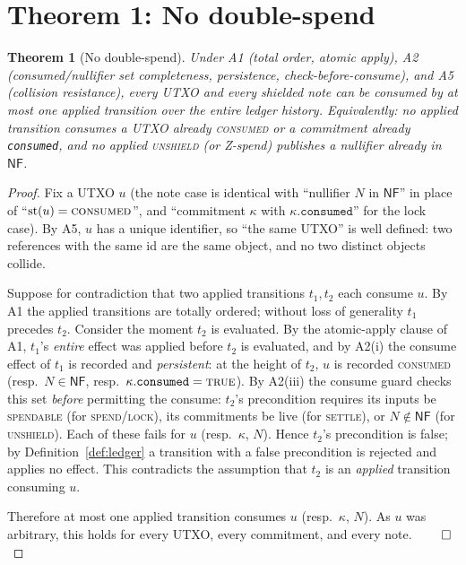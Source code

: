 \documentclass[11pt]{article}
\newtheorem{theorem}{Theorem}
\theoremstyle{definition}
\theoremstyle{remark}
\newcommand{\NF}{\mathsf{NF}}
\begin{document}
\section{Theorem 1: No double-spend}
\label{sec:t1}

\begin{theorem}[No double-spend]
\label{thm:double}
Under A1 (total order, atomic apply), A2 (consumed/nullifier set
completeness, persistence, check-before-consume), and A5 (collision
resistance), every UTXO and every shielded note can be consumed by at most
one applied transition over the entire ledger history. Equivalently: no
applied transition consumes a UTXO already \textsc{consumed} or a
commitment already \texttt{consumed}, and no applied \textsc{unshield} (or
Z-spend) publishes a nullifier already in $\NF$.
\end{theorem}

\begin{proof}
Fix a UTXO $u$ (the note case is identical with ``nullifier $N$ in $\NF$''
in place of ``$\mathrm{st}(u)=\textsc{consumed}$'', and ``commitment
$\kappa$ with $\kappa.\texttt{consumed}$'' for the lock case). By A5,
$u$ has a unique identifier, so ``the same UTXO'' is well defined: two
references with the same id are the same object, and no two distinct
objects collide.

Suppose for contradiction that two applied transitions $t_1,t_2$ each
consume $u$. By A1 the applied transitions are totally ordered; without
loss of generality $t_1$ precedes $t_2$. Consider the moment $t_2$ is
evaluated. By the atomic-apply clause of A1, $t_1$'s \emph{entire} effect
was applied before $t_2$ is evaluated, and by A2(i) the consume effect of
$t_1$ is recorded and \emph{persistent}: at the height of $t_2$, $u$ is
recorded \textsc{consumed} (resp.\ $N\in\NF$, resp.\
$\kappa.\texttt{consumed}=\textsc{true}$). By A2(iii) the consume guard
checks this set \emph{before} permitting the consume: $t_2$'s precondition
requires its inputs be \textsc{spendable} (for \textsc{spend}/\textsc{lock}),
its commitments be live (for \textsc{settle}), or $N\notin\NF$ (for
\textsc{unshield}). Each of these fails for $u$ (resp.\ $\kappa$, $N$).
Hence $t_2$'s precondition is false; by Definition~\ref{def:ledger} a
transition with a false precondition is rejected and applies no effect.
This contradicts the assumption that $t_2$ is an \emph{applied} transition
consuming $u$.

Therefore at most one applied transition consumes $u$ (resp.\ $\kappa$,
$N$). As $u$ was arbitrary, this holds for every UTXO, every commitment,
and every note. $\qed$
\end{proof}
\end{document}
